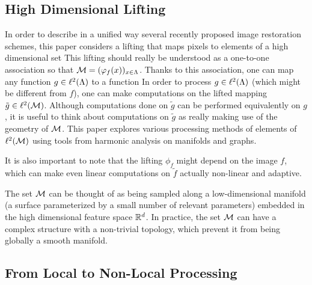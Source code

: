 \documentclass[final]{siamltex}
\newcommand{\manilift}{\phi_f}
\newcommand{\lifted}{\tilde f}
\newcommand{\liftedg}{\tilde g}
\begin{document}
\subsection{High Dimensional Lifting}
\label{sec-highdim-lifting}

In order to describe in a unified way several recently proposed image restoration schemes, this paper considers a lifting that maps pixels to elements of a high dimensional set
\eq{
	\manilift : x \in \La \longmapsto \manilift(x) \in \Mm \subset \RR^d.
}
This lifting should really be understood as a one-to-one association so that $\Mm = ( \manilift(x) )_{x \in \La}$. Thanks to this association, one can map any function $g \in \ell^2(\Lambda)$ to a function 
\eql{\label{eq-def-lifted}
	\liftedg : \Mm \longrightarrow \RR \qqwhereqq \foralls p \in \Mm, \quad \liftedg(p) = g( \manilift^{-1}(p) ).
}
In order to process $g \in \ell^2(\Lambda)$ (which might be different from $f$), one can make computations on the lifted mapping $\liftedg \in \ldeux(\Mm)$. Although computations done on $\liftedg$ can be performed equivalently on $g$, it is useful to think about computations on $\liftedg$ as really making use of the geometry of $\mathcal{M}$. This paper explores various processing methods of elements of $\ell^2(\mathcal{M})$ using tools from harmonic analysis on manifolds and graphs. 

It is also important to note that the lifting $\manilift$ might depend on the image $f$, which can make even linear computations on $\lifted$ actually non-linear and adaptive.

The set $\mathcal{M}$ can be thought of as being sampled along a low-dimensional manifold (a surface parameterized by a small number of relevant parameters) embedded in the high dimensional feature space $\mathbb{R}^d$. In practice, the set $\mathcal{M}$ can have a complex structure with a non-trivial topology, which prevent it from being globally a smooth manifold. 

\subsection{From Local to Non-Local Processing}
\end{document}
